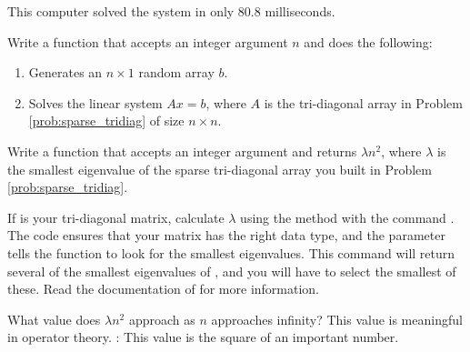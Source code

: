 This computer solved the system in only 80.8 milliseconds.

\begin{problem}
Write a function that accepts an integer argument $n$ and does the following:
\begin{enumerate}
\item Generates an $n \times 1$ random array $b$.
\item Solves the linear system $Ax = b$, where $A$ is the tri-diagonal array in Problem \ref{prob:sparse_tridiag} of size $n \times n$.
\end{enumerate}
\end{problem}



\begin{problem}
Write a function that accepts an integer argument  and returns $\lambda n^2$, where
$\lambda$ is the smallest eigenvalue of the sparse tri-diagonal array you built in Problem \ref{prob:sparse_tridiag}.

If  is your tri-diagonal matrix, calculate $\lambda$ using the method  with the command . 
The code  ensures that your matrix has the right data type, and the parameter  tells the function to look for the smallest eigenvalues. 
This command will return several of the smallest eigenvalues of , and you will have to select the smallest of these. 
Read the documentation of  for more information.

What value does $\lambda n^2$ approach as $n$ approaches infinity? 
This value is meaningful in operator theory. 
: This value is the square of an important number.

\end{problem}





 
